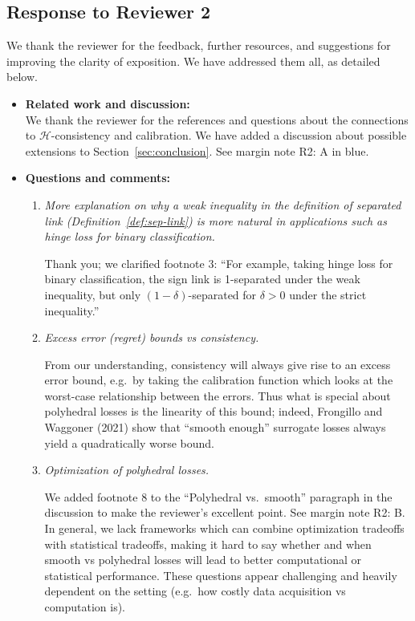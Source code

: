 \documentclass[a4paper]{article}
\begin{document}
\subsection*{Response to Reviewer 2}

We thank the reviewer for the feedback, further resources, and suggestions for improving the clarity of exposition.
We have addressed them all, as detailed below.

\begin{itemize}
\item \textbf{Related work and discussion:}\\
 We thank the reviewer for the references and questions about the connections to $\mathcal{H}$-consistency and calibration. We have added a discussion about possible extensions to Section~\ref{sec:conclusion}. See margin note R2: A in blue.
  
\item \textbf{Questions and comments:}
  \begin{enumerate}
  \item \emph{More explanation on why a weak inequality in the definition of separated link (Definition~\ref{def:sep-link}) is more natural in applications such as hinge loss for binary classification.}

    Thank you; we clarified footnote 3: ``For example, taking hinge loss for binary classification, the sign link is 1-separated under the weak inequality, but only $(1-\delta)$-separated for $\delta > 0$ under the strict inequality.''
    
  \item \emph{Excess error (regret) bounds vs consistency.}

    From our understanding, consistency will always give rise to an excess error bound, e.g.\ by taking the calibration function which looks at the worst-case relationship between the errors.
    Thus what is special about polyhedral losses is the linearity of this bound; indeed, Frongillo and Waggoner (2021) show that ``smooth enough'' surrogate losses always yield a quadratically worse bound.
    
  \item \emph{Optimization of polyhedral losses.}

    We added footnote 8 to the ``Polyhedral vs.\ smooth'' paragraph in the discussion to make the reviewer's excellent point. 
    See margin note R2: B.
    In general, we lack frameworks which can combine optimization tradeoffs with statistical tradeoffs, making it hard to say whether and when smooth vs polyhedral losses will lead to better computational or statistical performance.
    These questions appear challenging and heavily dependent on the setting (e.g.\ how costly data acquisition vs computation is).
    

\end{enumerate}
\end{itemize}
\end{document}
